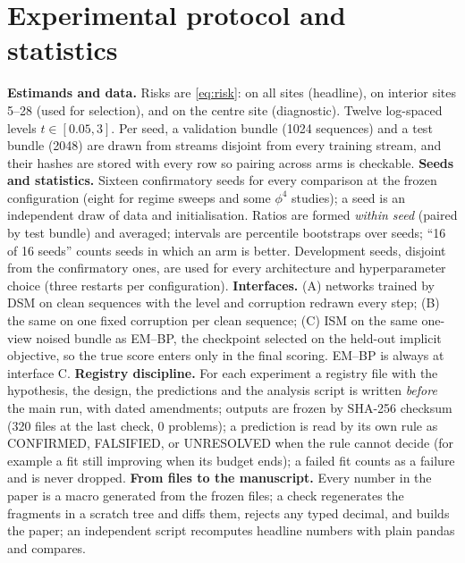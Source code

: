 \section{Experimental protocol and statistics}

\textbf{Estimands and data.} Risks are \eqref{eq:risk}: on all sites (headline), on interior sites 5--28 (used for selection), and on the centre site (diagnostic). Twelve log-spaced levels $t\in[0.05,3]$. Per seed, a validation bundle (1024 sequences) and a test bundle (2048) are drawn from streams disjoint from every training stream, and their hashes are stored with every row so pairing across arms is checkable.
\textbf{Seeds and statistics.} Sixteen confirmatory seeds for every comparison at the frozen configuration (eight for regime sweeps and some $\phi^4$ studies); a seed is an independent draw of data and initialisation. Ratios are formed \emph{within seed} (paired by test bundle) and averaged; intervals are percentile bootstraps over seeds; ``16 of 16 seeds'' counts seeds in which an arm is better. Development seeds, disjoint from the confirmatory ones, are used for every architecture and hyperparameter choice (three restarts per configuration).
\textbf{Interfaces.} (A) networks trained by DSM on clean sequences with the level and corruption redrawn every step; (B) the same on one fixed corruption per clean sequence; (C) ISM on the same one-view noised bundle as EM--BP, the checkpoint selected on the held-out implicit objective, so the true score enters only in the final scoring. EM--BP is always at interface C.
\textbf{Registry discipline.} For each experiment a registry file with the hypothesis, the design, the predictions and the analysis script is written \emph{before} the main run, with dated amendments; outputs are frozen by SHA-256 checksum (320 files at the last check, 0 problems); a prediction is read by its own rule as CONFIRMED, FALSIFIED, or UNRESOLVED when the rule cannot decide (for example a fit still improving when its budget ends); a failed fit counts as a failure and is never dropped.
\textbf{From files to the manuscript.} Every number in the paper is a macro generated from the frozen files; a check regenerates the fragments in a scratch tree and diffs them, rejects any typed decimal, and builds the paper; an independent script recomputes headline numbers with plain pandas and compares.
